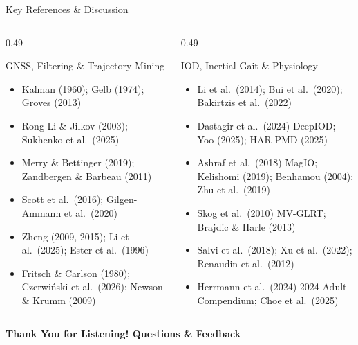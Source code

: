 \documentclass[aspectratio=169,10pt]{beamer}
\begin{document}
\begin{frame}{Key References \& Discussion}
  \begin{columns}[T]
    \begin{column}{0.49\textwidth}
      \begin{block}{GNSS, Filtering \& Trajectory Mining}
        \scriptsize
        \begin{itemize}\itemsep 2pt
          \item Kalman (1960); Gelb (1974); Groves (2013)
          \item Rong Li \& Jilkov (2003); Sukhenko et al.\ (2025)
          \item Merry \& Bettinger (2019); Zandbergen \& Barbeau (2011)
          \item Scott et al.\ (2016); Gilgen-Ammann et al.\ (2020)
          \item Zheng (2009, 2015); Li et al.\ (2025); Ester et al.\ (1996)
          \item Fritsch \& Carlson (1980); Czerwi\'nski et al.\ (2026); Newson \& Krumm (2009)
        \end{itemize}
      \end{block}
    \end{column}
    \begin{column}{0.49\textwidth}
      \begin{block}{IOD, Inertial Gait \& Physiology}
        \scriptsize
        \begin{itemize}\itemsep 2pt
          \item Li et al.\ (2014); Bui et al.\ (2020); Bakirtzis et al.\ (2022)
          \item Dastagir et al.\ (2024) DeepIOD; Yoo (2025); HAR-PMD (2025)
          \item Ashraf et al.\ (2018) MagIO; Kelishomi (2019); Benhamou (2004); Zhu et al.\ (2019)
          \item Skog et al.\ (2010) MV-GLRT; Brajdic \& Harle (2013)
          \item Salvi et al.\ (2018); Xu et al.\ (2022); Renaudin et al.\ (2012)
          \item Herrmann et al.\ (2024) 2024 Adult Compendium; Choe et al.\ (2025)
        \end{itemize}
      \end{block}
    \end{column}
  \end{columns}
  \vspace{0.35cm}
  \centering\large\textbf{\color{iuBlue}Thank You for Listening! Questions \& Feedback}
\end{frame}
\end{document}
